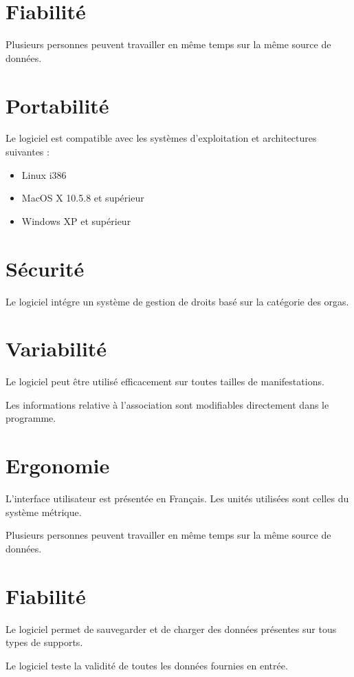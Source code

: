 \section{Fiabilité}
Plusieurs personnes peuvent travailler en même temps sur la même source de données.


\section{Portabilité}
Le logiciel est compatible avec les systèmes d'exploitation et architectures suivantes : 
\begin{itemize}
\item Linux i386
\item MacOS X 10.5.8 et supérieur
\item Windows XP et supérieur
\end{itemize}


\section{Sécurité}
Le logiciel intégre un système de gestion de droits basé sur la catégorie des orgas.


\section{Variabilité}
Le logiciel peut être utilisé efficacement sur toutes tailles de manifestations.

Les informations relative à l'association sont modifiables directement dans le programme.

\section{Ergonomie}
L'interface utilisateur est présentée en Français. Les unités utilisées sont celles du système métrique. 

Plusieurs personnes peuvent travailler en même temps sur la même source de données.


\section{Fiabilité}
Le logiciel permet de sauvegarder et de charger des données présentes sur tous types de supports.

Le logiciel teste la validité de toutes les données fournies en entrée.